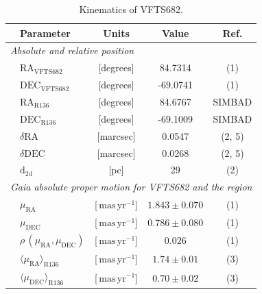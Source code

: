 \documentclass[apjl,twocolumn]{emulateapj}
\newcommand{\masyr}{\,\mathrm{mas}\,\mathrm{yr}^{-1}}
\begin{document}
\begin{table}
  \begin{center}
    \caption{Kinematics of VFTS682. }
    \begin{tabular}{llc|c|c}
      \hline
      \hline
      &Parameter & Units & Value & Ref.\\
      \hline
      \multicolumn{5}{l}{\emph{Absolute and relative position}} \\
      \hline
         &$\mathrm{RA}_\mathrm{VFTS682}$&[degrees] & \phantom{-}84.7314 %
                     & (1) \\        
               &$\mathrm{DEC}_\mathrm{VFTS682}$&[degrees] & -69.0741%
                     & (1)  \\    
                                                     
                        &$\mathrm{RA}_\mathrm{R136}$&[degrees] & \phantom{-}84.6767
                     &  SIMBAD  \\        
               &$     \mathrm{DEC}_\mathrm{R136}$&[degrees] &  -69.1009
                     &  SIMBAD \\       
        &$      \delta\mathrm{RA}$  &[marcsec] & \phantom{-0}0.0547                      
        &  (2, 5)
  \\        
               &$     \delta\mathrm{DEC}$  &[marcsec] & \phantom{-0}0.0268 
                     &  (2, 5) \\  
                       &$  \mathrm{d_\mathrm{2d}}$  &[pc] & 29
                     &  (2) \\         
                          
                     \hline
           \multicolumn{5}{l}{\emph{Gaia absolute proper motion for VFTS682
      and the region}} \\
      \hline
          &$\mu_\mathrm{RA}$&[$\masyr$] & $1.843\pm 0.070$
                     & (1) \\        
               &$\mu_\mathrm{DEC}$&[$\masyr$] & $0.786\pm 0.080$
                     &  (1) \\        
                 & $\rho\,(\mu_\mathrm{RA}, \mu_\mathrm{DEC})$ &[$\masyr$] & $0.026$
                        & (1)  \\         
       &$\langle\mu_\mathrm{RA}\rangle_\mathrm{R136}$&[$\masyr$] & $1.74\pm0.01$
                        & (3) \\
      &$\langle\mu_\mathrm{DEC}\rangle_\mathrm{R136}$&[$\masyr$]
                & $0.70\pm0.02$ &  (3)\\
\hline
      

\end{tabular}
\end{center}
\end{table}
\end{document}
